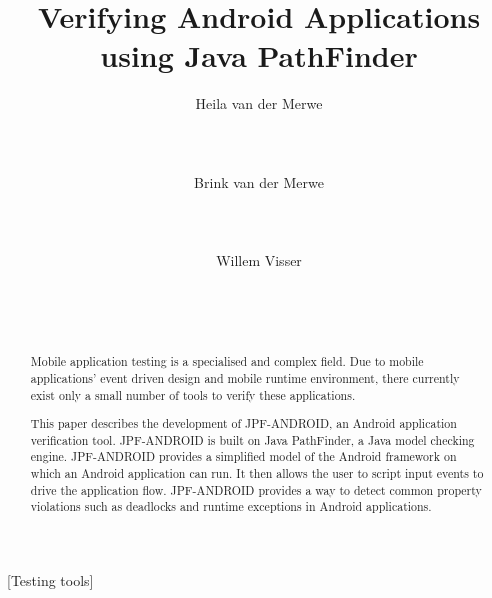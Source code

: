\documentclass{acm_proc_article-sp}
\begin{document}
\title{Verifying Android Applications using Java PathFinder}


\author{%
\alignauthor Heila van der Merwe\\
       \\
       \\
       \\
\alignauthor  Brink van der Merwe\\
 \\
       \\
       \\
\alignauthor  Willem Visser\\
 \\
       \\
       \\
}

\maketitle

\begin{abstract}
Mobile application testing is a specialised and complex field. Due to mobile applications' event driven design and mobile runtime
environment, there currently exist only a small number of tools to verify these applications.

This paper describes the development of JPF-ANDROID, an Android application verification tool. JPF-ANDROID is built on Java PathFinder, 
a Java model checking engine. JPF-ANDROID provides a simplified model of the Android framework on which an Android application can run. It then allows
the user to script input events to drive the application flow. JPF-ANDROID provides a way to detect common property violations such as deadlocks and runtime exceptions
in Android applications.
\end{abstract}

[Testing tools]
\end{document}
